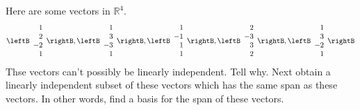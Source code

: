 \begin{enumialphparenastyle}
\begin{ex} Here are some vectors in $\mathbb{R}^{4}$. 
\begin{equation*}
\leftB 
\begin{array}{r}
1 \\ 
2 \\ 
-2 \\ 
1
\end{array}
\rightB ,\leftB 
\begin{array}{r}
1 \\ 
3 \\ 
-3 \\ 
1
\end{array}
\rightB ,\leftB 
\begin{array}{r}
1 \\ 
-1 \\ 
1 \\ 
1
\end{array}
\rightB ,\leftB 
\begin{array}{r}
2 \\ 
-3 \\ 
3 \\ 
2
\end{array}
\rightB ,\leftB 
\begin{array}{r}
1 \\ 
3 \\ 
-2 \\ 
1
\end{array}
\rightB
\end{equation*}
Thse vectors can't possibly be linearly independent. Tell why. Next obtain a
linearly independent subset of these vectors which has the same span as
these vectors. In other words, find a basis for the span of these vectors.
\end{ex}


\end{enumialphparenastyle}
